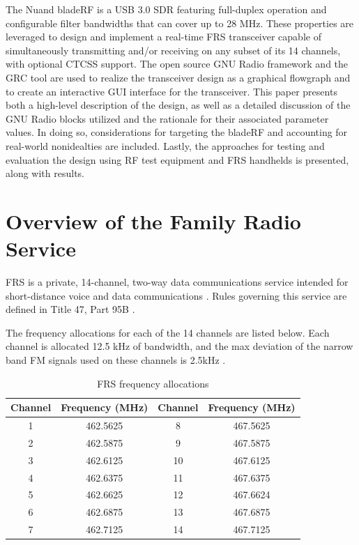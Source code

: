 The Nuand bladeRF is a USB 3.0 \ac{SDR} featuring full-duplex
operation and configurable filter bandwidths that can cover up to 28 MHz.
These properties are leveraged to design and implement a real-time \ac{FRS}
transceiver capable of simultaneously transmitting and/or receiving on any
subset of its 14 channels, with optional \ac{CTCSS} support. The open source
GNU Radio framework and the \ac{GRC} tool are used to realize the transceiver
design as a graphical flowgraph and to create an interactive GUI interface for
the transceiver. This paper presents both a high-level description of the
design, as well as a detailed discussion of the GNU Radio blocks utilized and
the rationale for their associated parameter values. In doing so,
considerations for targeting the bladeRF and accounting for real-world
nonidealties are included. Lastly, the approaches for testing and evaluation
the design using RF test equipment and FRS handhelds is presented, along with
results.

\cleardoublepage

\section{Overview of the Family Radio Service}

\ac{FRS} is a private, 14-channel, two-way data communications service
intended for short-distance voice and data communications \cite{FCC_FRS}. Rules
governing this service are defined in Title 47, Part 95B \cite{FCC_PART_95B}.

The frequency allocations for each of the 14 channels are listed below. Each
channel is allocated 12.5 kHz of bandwidth, and the max deviation of the
narrow band FM signals used on these channels is 2.5kHz \cite{FCC_PART_95B}.

\begin{table}[h]
  \centering
  \caption{FRS frequency allocations}
  \footnotesize
  \begin{tabular}{|c|c||c|c|}
    \hline
    \textbf{Channel}    & \textbf{Frequency (MHz)} &
    \textbf{Channel}    & \textbf{Frequency (MHz)} \\ \hline
    1 & 462.5625 & 8    & 467.5625 \\ \hline
    2 & 462.5875 & 9    & 467.5875 \\ \hline
    3 & 462.6125 & 10   & 467.6125 \\ \hline
    4 & 462.6375 & 11   & 467.6375 \\ \hline
    5 & 462.6625 & 12   & 467.6624 \\ \hline
    6 & 462.6875 & 13   & 467.6875 \\ \hline
    7 & 462.7125 & 14   & 467.7125 \\ \hline
  \end{tabular}
\end{table}

